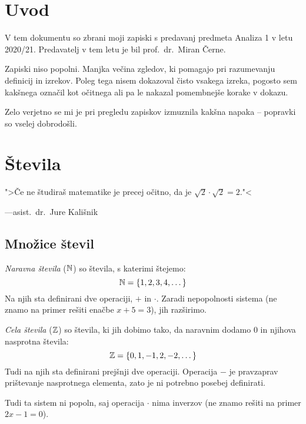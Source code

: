 \documentclass[12pt, a4paper]{article}
\begin{document}
\renewcommand{\headheight}{20pt}

\maketitle

\newpage

\tableofcontents

\newpage

\section*{Uvod}

V tem dokumentu so zbrani moji zapiski s predavanj predmeta Analiza 1 v letu 2020/21. Predavatelj v tem letu je bil prof.~dr.~Miran Černe.

Zapiski niso popolni. Manjka večina zgledov, ki pomagajo pri razumevanju definicij in izrekov. Poleg tega nisem dokazoval čisto vsakega izreka, pogosto sem kakšnega označil kot očitnega ali pa le nakazal pomembnejše korake v dokazu.

Zelo verjetno se mi je pri pregledu zapiskov izmuznila kakšna napaka -- popravki so vselej dobrodošli.

\newpage

\section{Števila}

\epigraph{">Če ne študiraš matematike je precej očitno, da je $\sqrt{2}\cdot\sqrt{2}=2$."<}{---asist.~dr.~Jure Kališnik}

\subsection{Množice števil}

\begin{definicija}
\emph{Naravna števila} ($\mathbb{N}$) so števila, s katerimi štejemo:
\[
\mathbb{N}=\left\{1,2,3,4,\dots\right\}
\]
Na njih sta definirani dve operaciji, $+$ in $\cdot$. Zaradi nepopolnosti sistema (ne znamo na primer rešiti enačbe $x+5=3$), jih razširimo.
\end{definicija}

\begin{definicija}
\emph{Cela števila} ($\mathbb{Z}$) so števila, ki jih dobimo tako, da naravnim dodamo 0 in njihova nasprotna števila:
\[
\mathbb{Z}=\left\{0,1,-1,2,-2,\dots\right\}
\]
Tudi na njih sta definirani prejšnji dve operaciji. Operacija $-$ je pravzaprav prištevanje nasprotnega elementa, zato je ni potrebno posebej definirati.

Tudi ta sistem ni popoln, saj operacija $\cdot$ nima inverzov (ne znamo rešiti na primer $2x-1=0$).
\end{definicija}
\end{document}
